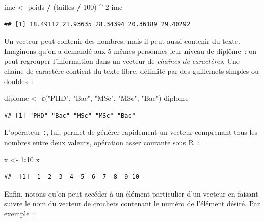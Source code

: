 \documentclass[12pt,]{book}
\newenvironment{Shaded}{\begin{snugshade}}{\end{snugshade}}
\newcommand{\DecValTok}[1]{\textcolor[rgb]{0.06,0.06,0.06}{#1}}
\newcommand{\KeywordTok}[1]{\textcolor[rgb]{0.27,0.27,0.27}{\textbf{#1}}}
\newcommand{\NormalTok}[1]{#1}
\newcommand{\OperatorTok}[1]{\textcolor[rgb]{0.43,0.43,0.43}{\textbf{#1}}}
\newcommand{\StringTok}[1]{\textcolor[rgb]{0.5,0.5,0.5}{#1}}
\begin{document}
\begin{Shaded}
\begin{Highlighting}[]
\NormalTok{imc <-}\StringTok{ }\NormalTok{poids }\OperatorTok{/}\StringTok{ }\NormalTok{(tailles }\OperatorTok{/}\StringTok{ }\DecValTok{100}\NormalTok{) }\OperatorTok{^}\StringTok{ }\DecValTok{2}
\NormalTok{imc}
\end{Highlighting}
\end{Shaded}

\begin{verbatim}
## [1] 18.49112 21.93635 28.34394 20.36189 29.40292
\end{verbatim}

Un vecteur peut contenir des nombres, mais il peut aussi contenir du texte. Imaginons qu'on a demandé aux 5 mêmes personnes leur niveau de diplôme~: on peut regrouper l'information dans un vecteur de \emph{chaînes de caractères}. Une chaîne de caractère contient du texte libre, délimité par des guillemets simples ou doubles~:

\begin{Shaded}
\begin{Highlighting}[]
\NormalTok{diplome <-}\StringTok{ }\KeywordTok{c}\NormalTok{(}\StringTok{"PHD"}\NormalTok{, }\StringTok{"Bac"}\NormalTok{, }\StringTok{"MSc"}\NormalTok{, }\StringTok{"MSc"}\NormalTok{, }\StringTok{"Bac"}\NormalTok{)}
\NormalTok{diplome}
\end{Highlighting}
\end{Shaded}

\begin{verbatim}
## [1] "PHD" "Bac" "MSc" "MSc" "Bac"
\end{verbatim}

L'opérateur \texttt{:}, lui, permet de générer rapidement un vecteur comprenant tous les nombres entre deux valeurs, opération assez courante sous R~:

\begin{Shaded}
\begin{Highlighting}[]
\NormalTok{x <-}\StringTok{ }\DecValTok{1}\OperatorTok{:}\DecValTok{10}
\NormalTok{x}
\end{Highlighting}
\end{Shaded}

\begin{verbatim}
##  [1]  1  2  3  4  5  6  7  8  9 10
\end{verbatim}

Enfin, notons qu'on peut accéder à un élément particulier d'un vecteur en faisant suivre le nom du vecteur de crochets contenant le numéro de l'élément désiré. Par exemple~:
\end{document}

